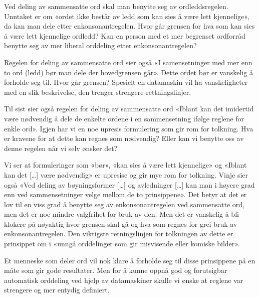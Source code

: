 \begin{items}
	\item Ved deling av sammensatte ord skal man benytte seg av ordleddsregelen. Unntaket er om «ordet ikke består av ledd som kan sies å være lett kjennelige»\cite{vinje}, da kan man dele etter enkonsonantregelen. Hvor går grensen for hva som kan sies å være lett kjennelige ordledd? Kan en person med et mer begrenset ordforråd benytte seg av mer liberal orddeling etter enkonsonantregelen?
	\item Regelen for deling av sammensatte ord sier også «I samensetninger med mer enn to ord (ledd) bør man dele der hovedgrensen går»\cite{vinje}. Dette ordet bør er vanskelig å forholde seg til. Hvor går grensen? Spesielt en datamaskin vil ha vanskeligheter med en slik beskrivelse, den trenger strengere rettningslinjer. 
	\item Til sist sier også regelen for deling av sammensatte ord «Iblant kan det imidertid være nødvendig å dele de enkelte ordene i en sammensetning ifølge reglene for enkle ord»\cite{vinje}. Igjen har vi en noe upresis formulering som gir rom for tolkning. Hva er kravene for at dette kan regnes som nødvendig? Eller kan vi benytte oss av denne regelen når vi selv ønsker det?
\end{items}

Vi ser at formuleringer som «bør», «kan sies å være lett kjennelige» og «Iblant kan det […] være nødvendig» er upresise og gir mye rom for tolkning. Vinje sier også «Ved deling av bøyningsformer […] og avledninger […] kan man i høyere grad enn ved sammensetninger velge mellom de to prinsippene»\cite{vinje}. Det betyr at det er lov til en viss grad å benytte seg av enkonsonantregelen ved sammensatte ord, men det er noe mindre valgfrihet for bruk av den. Men det er vanskelig å bli klokere på nøyaktig hvor grensen skal gå og hva som regnes for grei bruk av enkonsonantregelen. Den viktigste retningslinjen for tolkningen av dette er prinsippet om i «unngå orddelinger som gir misvisende eller komiske bilder». 

Et menneske som deler ord vil nok klare å forholde seg til disse prinsippene på en måte som gir gode resultater. Men for å kunne oppnå god og forutsigbar automatisk orddeling ved hjelp av datamaskiner skulle vi ønske at reglene var strengere og mer entydig definiert.


